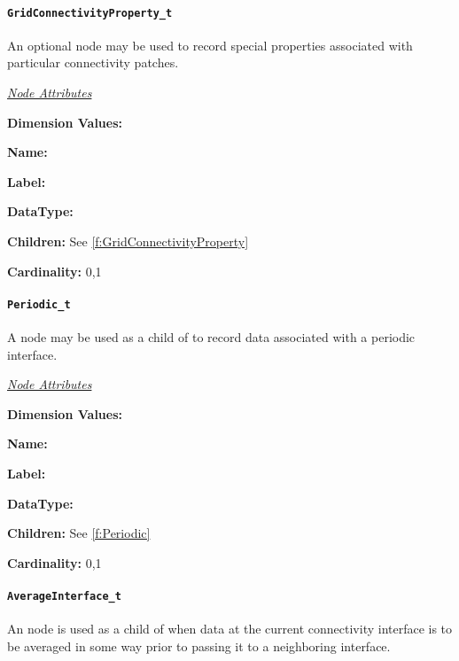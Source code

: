 \paragraph{\texttt{GridConnectivityProperty\_t}}

An optional  node may be used to
record special properties associated with particular connectivity
patches.

\textit{\uline{Node Attributes}}
\begin{Ventryic}{\textbf{Dimension Values:}}
\item [\textbf{Name:}]
\item [\textbf{Label:}]
\item [\textbf{DataType:}]
\item [\textbf{Children:}]
      See \autoref{f:GridConnectivityProperty}
\item [\textbf{Cardinality:}]
      0,1
\end{Ventryic}

\paragraph{\texttt{Periodic\_t}}

A  node may be used as a child of
 to record data associated with a
periodic interface.

\textit{\uline{Node Attributes}}
\begin{Ventryic}{\textbf{Dimension Values:}}
\item [\textbf{Name:}]
\item [\textbf{Label:}]
\item [\textbf{DataType:}]
\item [\textbf{Children:}]
      See \autoref{f:Periodic}
\item [\textbf{Cardinality:}]
      0,1
\end{Ventryic}

\paragraph{\texttt{AverageInterface\_t}}

An  node is used as a child of
 when data at the current connectivity
interface is to be averaged in some way prior to passing it to a
neighboring interface.

